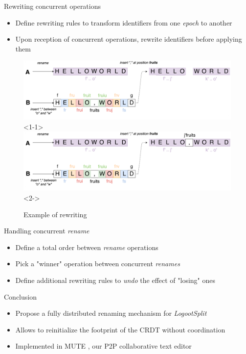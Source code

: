 \documentclass[10pt]{beamer}
\begin{document}
\begin{frame}{Rewriting concurrent operations}
  \begin{itemize}
    \item Define rewriting rules to transform identifiers from one \emph{epoch} to another
    \item Upon reception of concurrent operations, rewrite identifiers before applying them
  \end{itemize}
  \begin{figure}
    \includegraphics[scale=0.09]{img/concurrent-insert-rewritted-1.png}<1-1>
    \includegraphics[scale=0.09]{img/concurrent-insert-rewritted.png}<2->
    \caption{Example of rewriting}
  \end{figure}
\end{frame}

\begin{frame}{Handling concurrent \emph{rename}}
  \begin{itemize}
    \item Define a total order between \emph{rename} operations
    \item Pick a "winner" operation between concurrent \emph{renames}
    \item Define additional rewriting rules to \emph{undo} the effect of "losing" ones
  \end{itemize}
\end{frame}

\begin{frame}{Conclusion}
  \begin{itemize}
    \item Propose a fully distributed renaming mechanism for \emph{LogootSplit}
    \item Allows to reinitialize the footprint of the \ac{CRDT} without coordination

    \bigskip

    \item Implemented in MUTE \cite{nicolas:hal-01655438}, our P2P collaborative text editor
  \end{itemize}
\end{frame}
\end{document}
